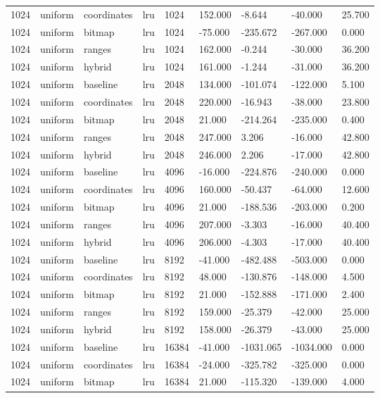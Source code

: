 \begin{tabular}{lllllllll}
1024 & uniform & coordinates & lru & 1024 & 152.000 & -8.644 & -40.000 & 25.700 \\
1024 & uniform & bitmap & lru & 1024 & -75.000 & -235.672 & -267.000 & 0.000 \\
1024 & uniform & ranges & lru & 1024 & 162.000 & -0.244 & -30.000 & 36.200 \\
1024 & uniform & hybrid & lru & 1024 & 161.000 & -1.244 & -31.000 & 36.200 \\
1024 & uniform & baseline & lru & 2048 & 134.000 & -101.074 & -122.000 & 5.100 \\
1024 & uniform & coordinates & lru & 2048 & 220.000 & -16.943 & -38.000 & 23.800 \\
1024 & uniform & bitmap & lru & 2048 & 21.000 & -214.264 & -235.000 & 0.400 \\
1024 & uniform & ranges & lru & 2048 & 247.000 & 3.206 & -16.000 & 42.800 \\
1024 & uniform & hybrid & lru & 2048 & 246.000 & 2.206 & -17.000 & 42.800 \\
1024 & uniform & baseline & lru & 4096 & -16.000 & -224.876 & -240.000 & 0.000 \\
1024 & uniform & coordinates & lru & 4096 & 160.000 & -50.437 & -64.000 & 12.600 \\
1024 & uniform & bitmap & lru & 4096 & 21.000 & -188.536 & -203.000 & 0.200 \\
1024 & uniform & ranges & lru & 4096 & 207.000 & -3.303 & -16.000 & 40.400 \\
1024 & uniform & hybrid & lru & 4096 & 206.000 & -4.303 & -17.000 & 40.400 \\
1024 & uniform & baseline & lru & 8192 & -41.000 & -482.488 & -503.000 & 0.000 \\
1024 & uniform & coordinates & lru & 8192 & 48.000 & -130.876 & -148.000 & 4.500 \\
1024 & uniform & bitmap & lru & 8192 & 21.000 & -152.888 & -171.000 & 2.400 \\
1024 & uniform & ranges & lru & 8192 & 159.000 & -25.379 & -42.000 & 25.000 \\
1024 & uniform & hybrid & lru & 8192 & 158.000 & -26.379 & -43.000 & 25.000 \\
1024 & uniform & baseline & lru & 16384 & -41.000 & -1031.065 & -1034.000 & 0.000 \\
1024 & uniform & coordinates & lru & 16384 & -24.000 & -325.782 & -325.000 & 0.000 \\
1024 & uniform & bitmap & lru & 16384 & 21.000 & -115.320 & -139.000 & 4.000 \\

\end{tabular}
